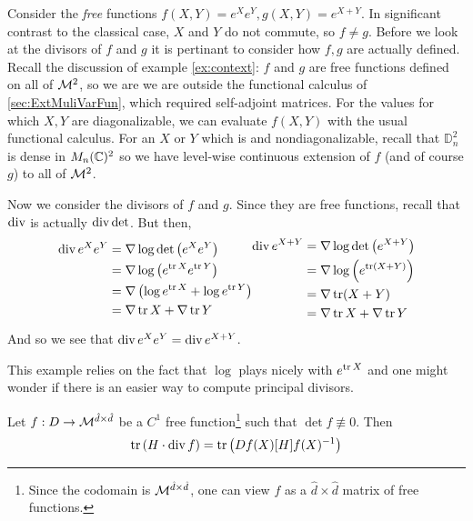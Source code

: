 \begin{example}
  Consider the \emph{free} functions \(f(X,Y)=e^Xe^Y, g(X,Y)=e^{X+Y}\). In
  significant contrast to the classical case, \(X\) and \(Y\) do not commute,
  so \(f\neq g\). Before we look at the divisors of \(f\) and \(g\) it is
  pertinant to consider how \(f,g\) are actually defined. Recall the discussion
  of example \ref{ex:context}: \(f\) and \(g\) are
  free functions defined on all of \(\mathcal{M}^2\), so we are we are outside the functional
  calculus of \cref{sec:ExtMuliVarFun}, which required self-adjoint matrices.
  For the values for which \(X, Y\) are diagonalizable, we can evaluate \(f(X,Y)\)
  with the usual functional calculus. For an \(X\) or \(Y\) which is
  and nondiagonalizable, recall that \(\mathbb{D}_n^2\) is dense in \(M_n(\mathbb{C})^2\) so
  we have level-wise continuous extension of \(f\) (and of course \(g\)) to all
  of \(\mathcal{M}^2\).

  Now we consider the divisors of \(f\) and \(g\). Since they are free
  functions, recall that \(\operatorname{div}\) is actually \(\operatorname{div} \det\). But then,
  \begin{equation*}
  \begin{split}
    \operatorname{div} e^Xe^Y &= \nabla \log \det \left( e^Xe^Y \right) \\
    &= \nabla \log \left( e^{\operatorname{tr} X} e^{\operatorname{tr} Y} \right) \\
    &= \nabla \left( \log e^{\operatorname{tr} X} + \log e^{\operatorname{tr} Y} \right) \\
    &= \nabla \operatorname{tr} X + \nabla\operatorname{tr} Y
  \end{split}
  \begin{split}
    \operatorname{div} e^{X+Y} &= \nabla \log \det \left( e^{X+Y} \right) \\
    &= \nabla \log \left( e^{\operatorname{tr} (X+Y)}  \right) \\
    &= \nabla \operatorname{tr} (X+Y) \\
    &= \nabla \operatorname{tr} X + \nabla\operatorname{tr} Y
  \end{split}
  \end{equation*}
  And so we see that \(\operatorname{div} e^Xe^Y = \operatorname{div} e^{X+Y}\).
\end{example}

This example relies on the fact that \(\log \) plays nicely with \(e^{\operatorname{tr} X}\)
and one might wonder if there is an easier way to compute principal divisors.

\begin{theorem}
  Let \(f: D \to \mathcal{M}^{\hat{d} \times \hat{d}}\) be a \(C^1\) free
  function\footnote{Since the codomain is \(\mathcal{M}^{\hat{d}\times \hat{d}}\), one
    can view \(f\) as a \(\hat{d} \times \hat{d}\) matrix of free functions.}
  such that \(\det f \not\equiv 0\). Then
  \[
    \operatorname{tr} \left( H \cdot \operatorname{div} f \right) = \operatorname{tr} \left(Df(X)[H] f(X)^{-1}\right)
  \]
\end{theorem}

